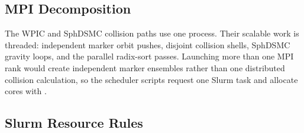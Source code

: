 \documentclass[11pt]{article}
\newcommand{\code}[1]{\texttt{\detokenize{#1}}}
\newif\ifvenusfullcpu
\begin{document}
\subsection{MPI Decomposition}

\ifvenusfullcpu
MPI decomposes the global \(L\)-grid into contiguous slabs.  Each rank owns the
full \(r\)-grid, full \(w\)-grid, and only its local \(L\) values and
\(f(r,w,L_{\rm local})\) slab.  Thus a rank-local transport loop uses the
global radial and momentum indices \(i,j\) together with a local angular index
\(k_{\rm local}\); thread-level work is drawn from these local
\((i,j,k_{\rm local})\) entries.  This ownership is possible because spherical
symmetry conserves \(L\), so each \(L\)-slice transports independently.
Moments are computed in two stages:
\begin{enumerate}
\item each rank integrates over its local \(L\) slab;
\item radial arrays such as \(\rho(r)\), \(p(r)\), and \(j(r)\) are summed by
\code{MPI_Allreduce}.
\end{enumerate}
After that reduction every rank has the same metric or Poisson field, and the
next advection step is independent over rank-local \(L\) slices.

MPI is supported for:
\begin{itemize}
\item Einstein--Vlasov;
\item Vlasov--Poisson in static backgrounds;
\item Vlasov--Poisson in expanding backgrounds;
\item collisionless Boltzmann--Poisson dispatch.
\end{itemize}
BP collision operators use one process and OpenMP threads.  Their shell-local
velocity coupling has a single-process ownership contract.
\else
The WPIC and SphDSMC collision paths use one process.
Their scalable work is threaded: independent marker orbit pushes, disjoint
collision shells, SphDSMC gravity loops, and the parallel radix-sort passes.
Launching more than one MPI rank would create independent marker ensembles
rather than one distributed collision calculation, so the scheduler scripts
request one Slurm task and allocate cores with \code{--cpus-per-task}.
\fi

\subsection{Slurm Resource Rules}
\end{document}
